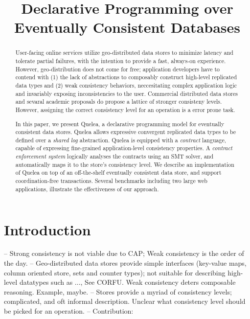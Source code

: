 \documentclass[pldi]{sigplanconf}
\begin{document}
%
%

\title{Declarative Programming over Eventually Consistent Databases }

\maketitle
\begin{abstract}
User-facing online services utilize geo-distributed data stores to minimize
latency and tolerate partial failures, with the intention to provide a fast,
always-on experience. However, geo-distribution does not come for free;
application developers have to contend with (1) the lack of abstractions to
composably construct high-level replicated data types and (2) weak consistency
behaviors, neccesitating complex application logic and invariably exposing
inconsistencies to the user. Commercial distributed data stores and sevaral
academic proposals do propose a lattice of stronger consisteny levels. However,
assigning the correct consistency level for an operation is a error prone task.

In this paper, we present Quelea, a declarative programming model for
eventually consistent data stores. Quelea allows expressive convergent
replicated data types to be defined over a \emph{shared log} abstraction.
Quelea is equipped with a \emph{contract} language, capable of expressing
fine-grained application-level consistency properties. A \emph{contract
enforcement system} logically analyses the contracts using an SMT solver, and
automatically maps it to the store's consistency level. We describe an
implementation of Quelea on top of an off-the-shelf eventually consistent data
store, and support coordination-free transactions. Several benchmarks including
two large web applications, illustrate the effectiveness of our approach.
\end{abstract}

\section{Introduction}

-- Strong consistency is not viable due to CAP; Weak consistency is the order
of the day.
-- Geo-distributed data stores provide simple interfaces (key-value maps,
column oriented store, sets and counter types); not suitable for describing
high-level datatypes such as ..., See CORFU. Weak consistency deters composable
reasoning. Example, maybe.
-- Stores provide a myriad of consistency levels; complicated, and oft informal
description. Unclear what consistency level should be picked for an operation.
-- Contribution:
\end{document}
